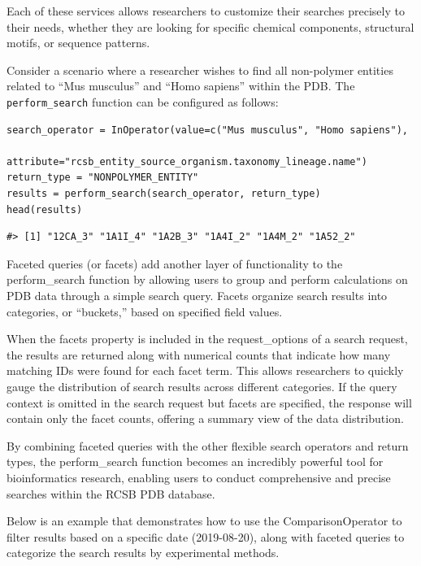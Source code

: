 Each of these services allows researchers to customize their searches precisely to their needs, whether they are looking for specific chemical components, structural motifs, or sequence patterns.

Consider a scenario where a researcher wishes to find all non-polymer entities related to ``Mus musculus'' and ``Homo sapiens'' within the PDB. The \texttt{perform\_search} function can be configured as follows:

\begin{verbatim}
search_operator = InOperator(value=c("Mus musculus", "Homo sapiens"),
                             attribute="rcsb_entity_source_organism.taxonomy_lineage.name")
return_type = "NONPOLYMER_ENTITY"
results = perform_search(search_operator, return_type)
head(results)
\end{verbatim}

\begin{verbatim}
#> [1] "12CA_3" "1A1I_4" "1A2B_3" "1A4I_2" "1A4M_2" "1A52_2"
\end{verbatim}

Faceted queries (or facets) add another layer of functionality to the perform\_search function by allowing users to group and perform calculations on PDB data through a simple search query. Facets organize search results into categories, or ``buckets,'' based on specified field values.

When the facets property is included in the request\_options of a search request, the results are returned along with numerical counts that indicate how many matching IDs were found for each facet term. This allows researchers to quickly gauge the distribution of search results across different categories. If the query context is omitted in the search request but facets are specified, the response will contain only the facet counts, offering a summary view of the data distribution.

By combining faceted queries with the other flexible search operators and return types, the perform\_search function becomes an incredibly powerful tool for bioinformatics research, enabling users to conduct comprehensive and precise searches within the RCSB PDB database.

Below is an example that demonstrates how to use the ComparisonOperator to filter results based on a specific date (2019-08-20), along with faceted queries to categorize the search results by experimental methods.

